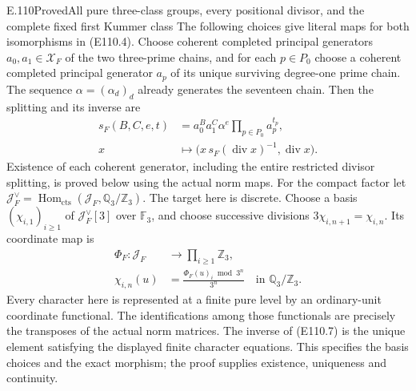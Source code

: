 \begin{statement}{E.110}{Proved}{All pure three-class groups, every positional divisor, and the complete fixed first Kummer class}
The following choices give literal maps for both isomorphisms in
(E110.4). Choose coherent completed principal generators
$a_0,a_1\in\mathcal X_F$ of the two three-prime chains, and for
each $p\in P_0$ choose a coherent completed principal generator
$a_p$ of its unique surviving degree-one prime chain.
The sequence $\alpha=(\alpha_d)_d$ already generates the seventeen
chain. Then the splitting and its inverse are
\[
 \begin{split}
 s_F(B,C,e,t)&=a_0^B a_1^C\alpha^e
                         \prod_{p\in P_0}a_p^{t_p},\\
 x&\longmapsto
   \bigl(x\,s_F(\operatorname{div}x)^{-1},
                         \operatorname{div}x\bigr).
 \end{split}
 \tag{E110.6}
\]
Existence of each coherent generator, including the entire restricted
divisor splitting, is proved below using the actual norm maps.
For the compact factor let
$\mathcal J_F^\vee=\operatorname{Hom}_{\mathrm{cts}}
(\mathcal J_F,\mathbb Q_3/\mathbb Z_3)$.
The target here is discrete.
Choose a basis $(\chi_{i,1})_{i\ge1}$ of
$\mathcal J_F^\vee[3]$ over $\mathbb F_3$, and choose successive
divisions $3\chi_{i,n+1}=\chi_{i,n}$. Its coordinate map is
\[
 \begin{split}
 \Phi_F:\mathcal J_F&\longrightarrow\prod_{i\ge1}\mathbb Z_3,\\
 \chi_{i,n}(u)&=\frac{\Phi_F(u)_i\bmod3^n}{3^n}
                         \quad\text{in }\mathbb Q_3/\mathbb Z_3 .
 \end{split}
 \tag{E110.7}
\]
Every character here is represented at a finite pure level by an
ordinary-unit coordinate functional. The identifications among those
functionals are precisely the transposes of the actual norm matrices.
The inverse of (E110.7) is the unique element satisfying the displayed
finite character equations. This specifies the basis choices and
the exact morphism; the proof supplies existence, uniqueness and
continuity.


\end{statement}

